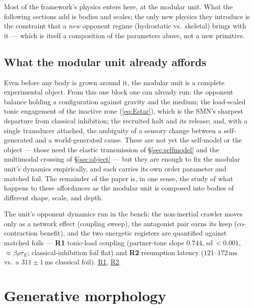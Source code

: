\documentclass{article}
\newcommand{\rtdlink}[2]{\href{https://smn-lab.readthedocs.io/en/latest/#1}{#2}}
\begin{document}
\noindent
Most of the framework's physics enters here, at the modular unit.  What the
following sections add is bodies and scales; the only new physics they
introduce is the constraint that a \emph{new} opponent regime
(hydrostatic vs.\ skeletal) brings with it --- which is itself a
composition of the parameters above, not a new primitive.

\subsection{What the modular unit already affords}\label{sec:atom-experiments}

Even before any body is grown around it, the modular unit is a complete
experimental object.  From this one block one can already run: the
opponent balance holding a configuration against gravity and the
medium; the load-scaled tonic engagement of the inactive zone
(\eqref{eq:Estar}), which is the SMN's sharpest departure from
classical inhibition; the recruited halt and its release; and, with a
single transducer attached, the ambiguity of a sensory change between a
self-generated and a world-generated cause.  These are not yet the
self-model or the object --- those need the elastic transmission of
\S\ref{sec:selfmodel} and the multimodal crossing of
\S\ref{sec:object} --- but they are enough to fix the modular unit's dynamics
empirically, and each carries its own order parameter and matched foil.
The remainder of the paper is, in one sense, the study of what happens
to these affordances as the modular unit is composed into bodies of different
shape, scale, and depth.

\begin{benchbox}
The unit's opponent dynamics run in the bench: the non-inertial crawler
moves only as a network effect (coupling sweep), the antagonist pair earns
its keep (co-contraction benefit), and the two energetic registers are
quantified against matched foils --- \textbf{R1} tonic-load coupling
(partner-tone slope $0.744$, sd\,$<\!0.001$, $\approx\beta\rho\tau_E$;
classical-inhibition foil flat) and \textbf{R2} resumption latency
($121$--$172$\,ms vs.\ a $311\pm1$\,ms classical foil).  \rtdlink{experiments/sweep_r1_tonic_load/}{R1},
\rtdlink{experiments/sweep_r2_resumption/}{R2}.
\end{benchbox}

\section{Generative morphology}\label{sec:kit}
\end{document}

